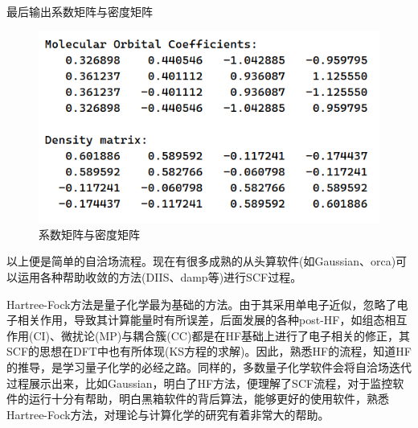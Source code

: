 \documentclass[]{article}
\begin{document}
最后输出系数矩阵与密度矩阵
\begin{figure}[H]
	\centering
	\includegraphics[scale=0.6]{coe.png}
	\caption{系数矩阵与密度矩阵}
	\label{Figure 5}
\end{figure}
以上便是简单的自洽场流程。现在有很多成熟的从头算软件(如Gaussian、orca)可以运用各种帮助收敛的方法(DIIS、damp等)进行SCF过程。

Hartree-Fock方法是量子化学最为基础的方法。由于其采用单电子近似，忽略了电子相关作用，导致其计算能量时有所误差，后面发展的各种post-HF，如组态相互作用(CI)、微扰论(MP)与耦合簇(CC)都是在HF基础上进行了电子相关的修正，其SCF的思想在DFT中也有所体现(KS方程的求解)。因此，熟悉HF的流程，知道HF的推导，是学习量子化学的必经之路。同样的，多数量子化学软件会将自洽场迭代过程展示出来，比如Gaussian，明白了HF方法，便理解了SCF流程，对于监控软件的运行十分有帮助，明白黑箱软件的背后算法，能够更好的使用软件，熟悉Hartree-Fock方法，对理论与计算化学的研究有着非常大的帮助。
\end{document}

